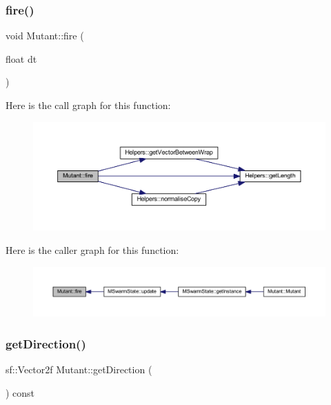 \subsubsection{\texorpdfstring{fire()}{fire()}}
{\footnotesize\ttfamily void Mutant\+::fire (\begin{DoxyParamCaption}\item[{float}]{dt }\end{DoxyParamCaption})}

Here is the call graph for this function\+:
\nopagebreak
\begin{figure}[H]
\begin{center}
\leavevmode
\includegraphics[width=350pt]{class_mutant_a64b25d92b0d694889047b71e3e501689_cgraph}
\end{center}
\end{figure}
Here is the caller graph for this function\+:
\nopagebreak
\begin{figure}[H]
\begin{center}
\leavevmode
\includegraphics[width=350pt]{class_mutant_a64b25d92b0d694889047b71e3e501689_icgraph}
\end{center}
\end{figure}
\mbox{\label{class_mutant_a9b3db53e81b2736b2390375b7a0aba2e}} 
\subsubsection{\texorpdfstring{get\+Direction()}{getDirection()}}
{\footnotesize\ttfamily sf\+::\+Vector2f Mutant\+::get\+Direction (\begin{DoxyParamCaption}{ }\end{DoxyParamCaption}) const}

